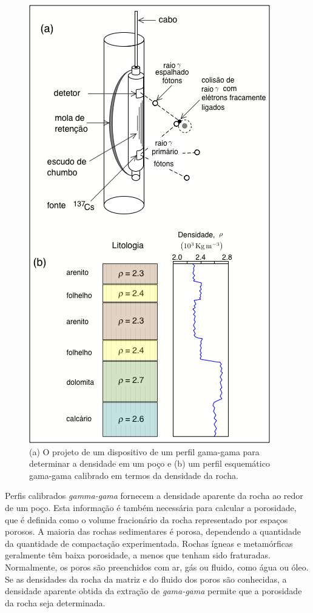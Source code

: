 \documentclass[]{book}
\theoremstyle{definition}
\theoremstyle{definition}
\theoremstyle{definition}
\theoremstyle{remark}
\begin{document}
\begin{figure}

{\centering \includegraphics[width=0.6\linewidth]{fig/Fig_02.33} 

}

\caption{(a) O projeto de um dispositivo de um perfil gama-gama para determinar a densidade em um poço e (b) um perfil esquemático gama-gama calibrado em termos da densidade da rocha.}\label{fig:gama}
\end{figure}

Perfis calibrados \emph{gamma-gama} fornecem a densidade aparente da rocha ao redor de um poço. Esta informação é também necessária para calcular a porosidade, que é definida como o volume fracionário da rocha representado por espaços porosos. A maioria das rochas sedimentares é porosa, dependendo a quantidade da quantidade de compactação experimentada. Rochas ígneas e metamórficas geralmente têm baixa porosidade, a menos que tenham sido fraturadas. Normalmente, os poros são preenchidos com ar, gás ou fluido, como água ou óleo. Se as densidades da rocha da matriz e do fluido dos poros são conhecidas, a densidade aparente obtida da extração de \emph{gama-gama} permite que a porosidade da rocha seja determinada.
\end{document}
